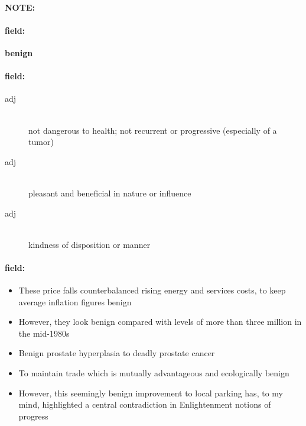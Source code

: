 \documentclass[12pt]{article}
\newenvironment{note}{\paragraph{NOTE:}}{}
\newenvironment{field}{\paragraph{field:}}{}
\begin{document}
\begin{note}
\begin{field}
\textbf{\large benign}
\end{field}


\begin{field}
\begin{description}
\item[adj] \hfill \\ 
not dangerous to health; not recurrent or progressive (especially of a tumor)

\item[adj] \hfill \\ 
pleasant and beneficial in nature or influence

\item[adj] \hfill \\ 
kindness of disposition or manner

\end{description}
\end{field}

\begin{field}
\begin{itemize}
\item These price falls counterbalanced rising energy and services costs, to keep average inflation figures benign
\item However, they look benign compared with levels of more than three million in the mid-1980s
\item Benign prostate hyperplasia to deadly prostate cancer
\item To maintain trade which is mutually advantageous and ecologically benign
\item However, this seemingly benign improvement to local parking has, to my mind, highlighted a central contradiction in Enlightenment notions of progress
\end{itemize}
\end{field}
\end{note}
\end{document}

